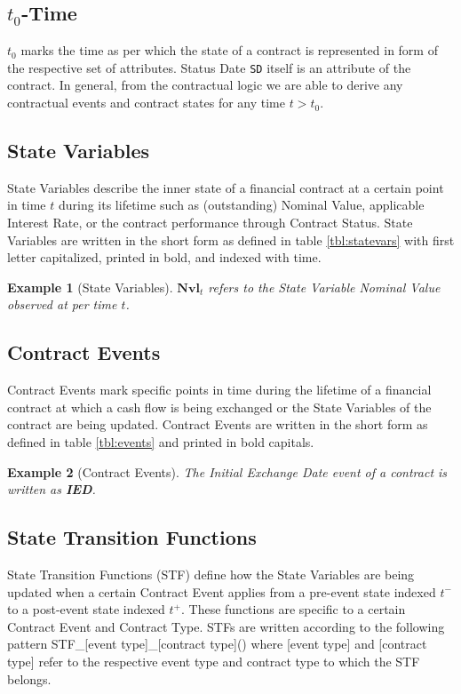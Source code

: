 \documentclass[9pt,oneside]{amsart}
\newtheorem{example}{Example}
\newcommand{\svar}[2]{\textbf{#1}_{#2}}
\newcommand{\attr}[1]{\texttt{#1}}
\newcommand{\stf}[2]{STF\_#1\_#2()}
\begin{document}
\begin{multicols}{2}
\subsection{$t_0$-Time}

$t_0$ marks the time as per which the state of a contract is represented in form of the respective set of attributes. Status Date \attr{SD} itself is an attribute of the contract. In general, from the contractual logic we are able to derive any contractual events and contract states for any time $t>t_0$.


\subsection{State Variables}

State Variables describe the inner state of a financial contract at a certain point in time $t$ during its lifetime such as (outstanding) Nominal Value, applicable Interest Rate, or the contract performance through Contract Status. State Variables are written in the short form as defined in table \ref{tbl:statevars} with first letter capitalized, printed in bold, and indexed with time.

\begin{example}[State Variables]
$\svar{Nvl}{t}$ refers to the State Variable \textit{Nominal Value} observed at per time $t$.
\end{example}


\subsection{Contract Events}

Contract Events mark specific points in time during the lifetime of a financial contract at which a cash flow is being exchanged or the State Variables of the contract are being updated. Contract Events are written in the short form as defined in table \ref{tbl:events} and printed in bold capitals.

\begin{example}[Contract Events]
The \textit{Initial Exchange Date} event of a contract is written as \textbf{IED}.
\end{example}


\subsection{State Transition Functions}

State Transition Functions (STF) define how the State Variables are being updated when a certain Contract Event applies from a pre-event state indexed $t^-$ to a post-event state indexed $t^+$. These functions are specific to a certain Contract Event and Contract Type. STFs are written according to the following pattern \stf{[event type]}{[contract type]} where [event type] and [contract type] refer to the respective event type and contract type to which the STF belongs.


\end{multicols}
\end{document}
